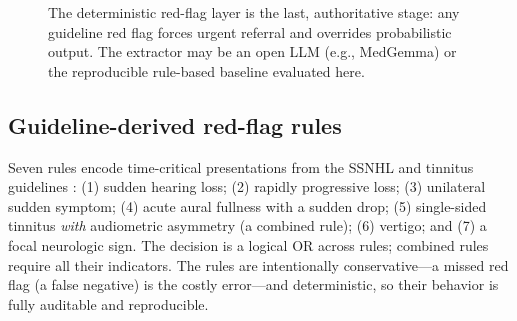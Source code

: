 \documentclass[11pt]{article}
\begin{document}
\begin{figure}[htbp]
\centering
{}
\caption{The deterministic red-flag layer is the last, authoritative stage: any guideline red flag forces urgent referral and overrides probabilistic output. The extractor may be an open LLM (e.g., MedGemma) or the reproducible rule-based baseline evaluated here.}
\label{fig:arch}
\end{figure}

\subsection{Guideline-derived red-flag rules}
Seven rules encode time-critical presentations from the SSNHL and tinnitus guidelines \cite{chandrasekhar2019ssnhl,tunkel2014cpg}: (1) sudden hearing loss; (2) rapidly progressive loss; (3) unilateral sudden symptom; (4) acute aural fullness with a sudden drop; (5) single-sided tinnitus \emph{with} audiometric asymmetry (a combined rule); (6) vertigo; and (7) a focal neurologic sign. The decision is a logical OR across rules; combined rules require all their indicators. The rules are intentionally conservative---a missed red flag (a false negative) is the costly error---and deterministic, so their behavior is fully auditable and reproducible.
\end{document}
